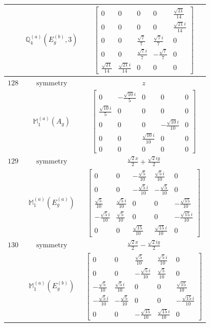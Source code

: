 \documentclass[fleqn,8pt,landscape]{jsarticle}
\begin{document}
\begin{longtable}{ccc}
$  $ & $ \mathbb{Q}_{4}^{(a)}(E_{g}^{(b)},3) $ & $ \begin{bmatrix} 0 & 0 & 0 & 0 & \frac{\sqrt{21}}{14} \\ 0 & 0 & 0 & 0 & \frac{\sqrt{21} i}{14} \\ 0 & 0 & \frac{\sqrt{7}}{7} & \frac{\sqrt{7} i}{7} & 0 \\ 0 & 0 & \frac{\sqrt{7} i}{7} & - \frac{\sqrt{7}}{7} & 0 \\ \frac{\sqrt{21}}{14} & \frac{\sqrt{21} i}{14} & 0 & 0 & 0 \end{bmatrix} $ \\ \hline
$ 128 $ & $ \text{symmetry} $ & $ z $ \\
$  $ & $ \mathbb{M}_{1}^{(a)}(A_{g}) $ & $ \begin{bmatrix} 0 & - \frac{\sqrt{10} i}{5} & 0 & 0 & 0 \\ \frac{\sqrt{10} i}{5} & 0 & 0 & 0 & 0 \\ 0 & 0 & 0 & - \frac{\sqrt{10} i}{10} & 0 \\ 0 & 0 & \frac{\sqrt{10} i}{10} & 0 & 0 \\ 0 & 0 & 0 & 0 & 0 \end{bmatrix} $ \\ \hline
$ 129 $ & $ \text{symmetry} $ & $ \frac{\sqrt{2} x}{2} + \frac{\sqrt{2} i y}{2} $ \\
$  $ & $ \mathbb{M}_{1}^{(a)}(E_{g}^{(a)}) $ & $ \begin{bmatrix} 0 & 0 & - \frac{\sqrt{5}}{10} & \frac{\sqrt{5} i}{10} & 0 \\ 0 & 0 & - \frac{\sqrt{5} i}{10} & - \frac{\sqrt{5}}{10} & 0 \\ \frac{\sqrt{5}}{10} & \frac{\sqrt{5} i}{10} & 0 & 0 & - \frac{\sqrt{15}}{10} \\ - \frac{\sqrt{5} i}{10} & \frac{\sqrt{5}}{10} & 0 & 0 & - \frac{\sqrt{15} i}{10} \\ 0 & 0 & \frac{\sqrt{15}}{10} & \frac{\sqrt{15} i}{10} & 0 \end{bmatrix} $ \\ \hline
$ 130 $ & $ \text{symmetry} $ & $ \frac{\sqrt{2} x}{2} - \frac{\sqrt{2} i y}{2} $ \\
$  $ & $ \mathbb{M}_{1}^{(a)}(E_{g}^{(b)}) $ & $ \begin{bmatrix} 0 & 0 & \frac{\sqrt{5}}{10} & \frac{\sqrt{5} i}{10} & 0 \\ 0 & 0 & - \frac{\sqrt{5} i}{10} & \frac{\sqrt{5}}{10} & 0 \\ - \frac{\sqrt{5}}{10} & \frac{\sqrt{5} i}{10} & 0 & 0 & \frac{\sqrt{15}}{10} \\ - \frac{\sqrt{5} i}{10} & - \frac{\sqrt{5}}{10} & 0 & 0 & - \frac{\sqrt{15} i}{10} \\ 0 & 0 & - \frac{\sqrt{15}}{10} & \frac{\sqrt{15} i}{10} & 0 \end{bmatrix} $ \\ \hline

\end{longtable}
\end{document}
